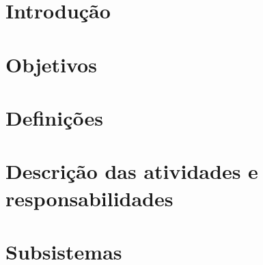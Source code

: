 \chapter{Introdução}


\chapter{Objetivos}


\chapter{Definições}


\chapter{Descrição das atividades e responsabilidades}


\chapter{Subsistemas}

